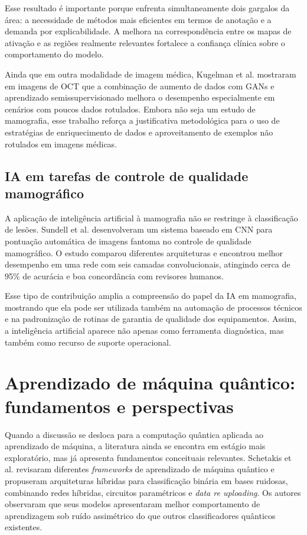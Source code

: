 \documentclass[
    12pt,
    openright,
    oneside,
    a4paper,
    english,
    brazil
]{abntex2}
\begin{document}
Esse resultado é importante porque enfrenta simultaneamente dois gargalos da área: a necessidade de métodos mais eficientes em termos de anotação e a demanda por explicabilidade. A melhora na correspondência entre os mapas de ativação e as regiões realmente relevantes fortalece a confiança clínica sobre o comportamento do modelo.

Ainda que em outra modalidade de imagem médica, Kugelman et al. \cite{kugelman2024} mostraram em imagens de OCT que a combinação de aumento de dados com GANs e aprendizado semissupervisionado melhora o desempenho especialmente em cenários com poucos dados rotulados. Embora não seja um estudo de mamografia, esse trabalho reforça a justificativa metodológica para o uso de estratégias de enriquecimento de dados e aproveitamento de exemplos não rotulados em imagens médicas.

\subsection{IA em tarefas de controle de qualidade mamográfico}

A aplicação de inteligência artificial à mamografia não se restringe à classificação de lesões. Sundell et al. \cite{sundell2022} desenvolveram um sistema baseado em CNN para pontuação automática de imagens fantoma no controle de qualidade mamográfico. O estudo comparou diferentes arquiteturas e encontrou melhor desempenho em uma rede com seis camadas convolucionais, atingindo cerca de 95\% de acurácia e boa concordância com revisores humanos.

Esse tipo de contribuição amplia a compreensão do papel da IA em mamografia, mostrando que ela pode ser utilizada também na automação de processos técnicos e na padronização de rotinas de garantia de qualidade dos equipamentos. Assim, a inteligência artificial aparece não apenas como ferramenta diagnóstica, mas também como recurso de suporte operacional.

\section{Aprendizado de máquina quântico: fundamentos e perspectivas}

Quando a discussão se desloca para a computação quântica aplicada ao aprendizado de máquina, a literatura ainda se encontra em estágio mais exploratório, mas já apresenta fundamentos conceituais relevantes. Schetakis et al. \cite{schetakis2022} revisaram diferentes \textit{frameworks} de aprendizado de máquina quântico e propuseram arquiteturas híbridas para classificação binária em bases ruidosas, combinando redes híbridas, circuitos paramétricos e \textit{data re uploading}. Os autores observaram que seus modelos apresentaram melhor comportamento de aprendizagem sob ruído assimétrico do que outros classificadores quânticos existentes.
\end{document}

